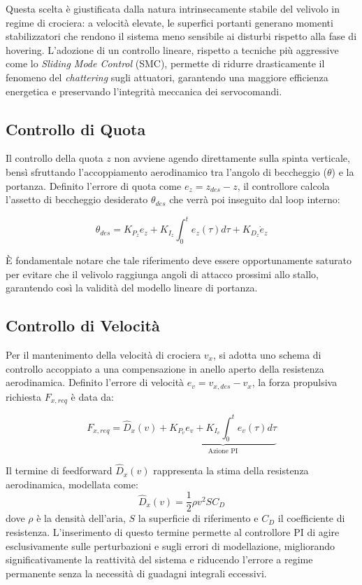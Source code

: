 Questa scelta è giustificata dalla natura intrinsecamente stabile del velivolo in regime di crociera: a velocità elevate, le superfici portanti generano momenti stabilizzatori che rendono il sistema meno sensibile ai disturbi rispetto alla fase di hovering. L'adozione di un controllo lineare, rispetto a tecniche più aggressive come lo \textit{Sliding Mode Control} (SMC), permette di ridurre drasticamente il fenomeno del \textit{chattering} sugli attuatori, garantendo una maggiore efficienza energetica e preservando l'integrità meccanica dei servocomandi.

\subsection{Controllo di Quota}
Il controllo della quota $z$ non avviene agendo direttamente sulla spinta verticale, bensì sfruttando l'accoppiamento aerodinamico tra l'angolo di beccheggio ($\theta$) e la portanza. Definito l'errore di quota come $e_z = z_{des} - z$, il controllore calcola l'assetto di beccheggio desiderato $\theta_{des}$ che verrà poi inseguito dal loop interno:

\begin{equation}
    \theta_{des} = K_{P_{z}} e_z + K_{I_{z}} \int_{0}^{t} e_z(\tau) d\tau + K_{D_{z}} \dot{e}_z
\end{equation}

È fondamentale notare che tale riferimento deve essere opportunamente saturato per evitare che il velivolo raggiunga angoli di attacco prossimi allo stallo, garantendo così la validità del modello lineare di portanza.

\subsection{Controllo di Velocità}
Per il mantenimento della velocità di crociera $v_x$, si adotta uno schema di controllo accoppiato a una compensazione in anello aperto della resistenza aerodinamica. Definito l'errore di velocità $e_v = v_{x,des} - v_x$, la forza propulsiva richiesta $F_{x,req}$ è data da:

\begin{equation}
    F_{x,req} = \hat{D}_x(v) + \underbrace{K_{P_v} e_v + K_{I_v} \int_{0}^{t} e_v(\tau) d\tau}_{\text{Azione PI}}
    \label{eq:fx}
\end{equation}

Il termine di feedforward $\hat{D}_x(v)$ rappresenta la stima della resistenza aerodinamica, modellata come:
\begin{equation}
    \hat{D}_x(v) = \frac{1}{2} \rho v^2 S C_D
\end{equation}
dove $\rho$ è la densità dell'aria, $S$ la superficie di riferimento e $C_D$ il coefficiente di resistenza. 
L'inserimento di questo termine permette al controllore PI di agire esclusivamente sulle perturbazioni e sugli errori di modellazione, 
migliorando significativamente la reattività del sistema e riducendo l'errore a regime permanente senza la necessità di guadagni integrali 
eccessivi.

